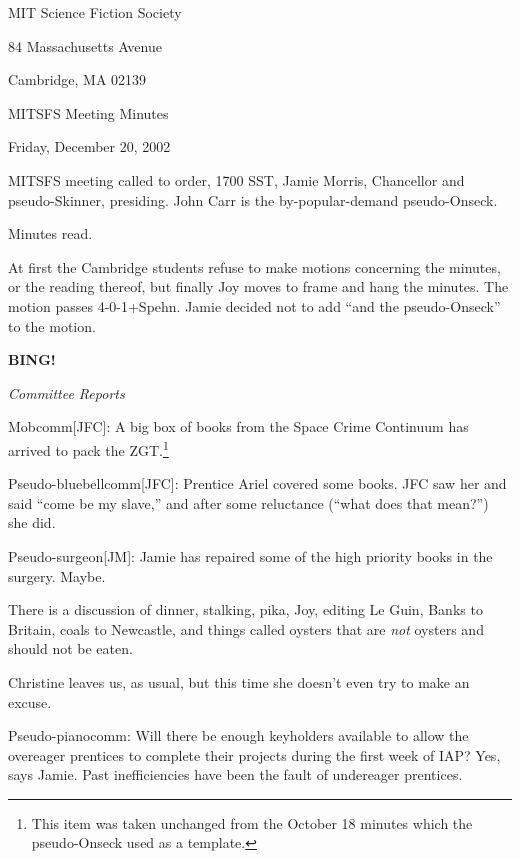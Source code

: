 \documentclass[12pt]{article}
\newcommand{\bing}{{\bf BING!} }
\newcommand{\goto}[1]{\bing \vskip 12pt \centerline{{\em{#1}}}}
\begin{document}
\begin{center}

MIT Science Fiction Society 

84 Massachusetts Avenue

Cambridge, MA 02139

\vspace{12pt}

MITSFS Meeting Minutes 

Friday, December 20, 2002

\end{center}
 
\vspace{18pt}

\setlength{\parskip}{6pt}

\noindent
MITSFS meeting called to order, 1700 SST,
Jamie Morris, Chancellor and pseudo-Skinner, presiding.
John Carr is the by-popular-demand pseudo-Onseck.

Minutes read.

At first the Cambridge students refuse to make motions concerning
the minutes, or the reading thereof, but finally Joy moves to frame
and hang the minutes.  The motion passes \hbox{4-0-1+Spehn}.  Jamie
decided not to add ``and the pseudo-Onseck'' to the motion.

\goto{Committee Reports}

Mobcomm[JFC]: A big box of books from the Space Crime Continuum has
arrived to pack the ZGT.\footnote{This item was taken unchanged from
the October 18 minutes which the pseudo-Onseck used as a template.}

Pseudo-bluebellcomm[JFC]: Prentice Ariel covered some books.
JFC saw her and said ``come be my slave,'' and after some
reluctance (``what does that mean?'') she did.

Pseudo-surgeon[JM]: Jamie has repaired some of the high priority books
in the surgery.  Maybe.

There is a discussion of dinner, stalking, pika, Joy, editing Le Guin,
Banks to Britain, coals to Newcastle, and things called oysters that
are {\em not} oysters and should not be eaten.

Christine leaves us, as usual, but this time she doesn't even try to
make an excuse.

Pseudo-pianocomm: Will there be enough keyholders available to allow
the overeager prentices to complete their projects during the first
week of IAP?  Yes, says Jamie.  Past inefficiencies have been the
fault of undereager prentices.
\end{document}
